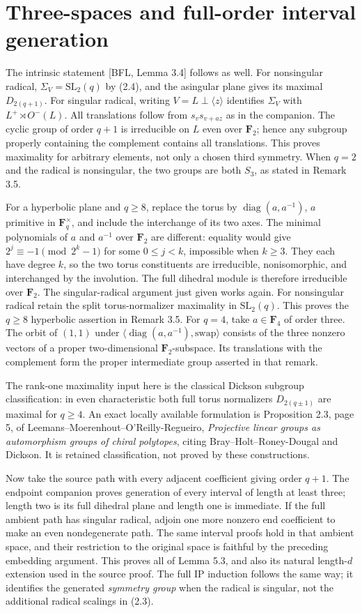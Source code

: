 \documentclass[11pt,a4paper]{article}
\newcommand{\gen}[1]{\langle#1\rangle}
\newcommand{\F}{\mathbf F}
\begin{document}
\section{Three-spaces and full-order interval generation}
The intrinsic statement [BFL, Lemma 3.4] follows as well.
For nonsingular radical, $\Sigma_V=\mathrm{SL}_2(q)$ by (2.4),
and the asingular plane gives its maximal $D_{2(q+1)}$.
For singular radical, writing $V=L\perp\gen z$ identifies
$\Sigma_V$ with $L^+\rtimes O^-(L)$. All translations follow
from $s_v s_{v+az}$ as in the companion. The cyclic group of
order $q+1$ is irreducible on $L$ even over $\F_2$; hence any
subgroup properly containing the complement contains all translations.
This proves maximality for arbitrary elements, not only a chosen
third symmetry. When $q=2$ and the radical is nonsingular, the
two groups are both $S_3$, as stated in Remark 3.5.

For a hyperbolic plane and $q\geq8$, replace the torus by
$\operatorname{diag}(a,a^{-1})$, $a$ primitive in $\F_q^\times$,
and include the interchange of its two axes. The minimal
polynomials of $a$ and $a^{-1}$ over $\F_2$ are different:
equality would give $2^j\equiv-1\pmod{2^k-1}$ for some
$0\leq j<k$, impossible when $k\geq3$. They each have degree
$k$, so the two torus constituents are irreducible, nonisomorphic,
and interchanged by the involution. The full dihedral module is
therefore irreducible over $\F_2$. The singular-radical argument
just given works again. For nonsingular radical retain the split
torus-normalizer maximality in $\mathrm{SL}_2(q)$.
This proves the $q\geq8$ hyperbolic assertion in Remark 3.5.
For $q=4$, take $a\in\F_4$ of order three. The orbit of $(1,1)$
under $\gen{\operatorname{diag}(a,a^{-1}),\text{swap}}$ consists
of the three nonzero vectors of a proper two-dimensional
$\F_2$-subspace. Its translations with the complement form the
proper intermediate group asserted in that remark.

The rank-one maximality input here is the classical Dickson
subgroup classification: in even characteristic both full torus
normalizers $D_{2(q\pm1)}$ are maximal for $q\geq4$.
An exact locally available formulation is Proposition 2.3, page 5,
of Leemans--Moerenhout--O'Reilly-Regueiro,
\emph{Projective linear groups as automorphism groups of chiral
polytopes}, citing Bray--Holt--Roney-Dougal and Dickson.
It is retained classification, not proved by these constructions.

Now take the source path with every adjacent coefficient giving
order $q+1$. The endpoint companion proves generation of every
interval of length at least three; length two is its full dihedral
plane and length one is immediate. If the full ambient path has
singular radical, adjoin one more nonzero end coefficient to make
an even nondegenerate path. The same interval proofs hold in that
ambient space, and their restriction to the original space is
faithful by the preceding embedding argument. This proves all of
Lemma 5.3, and also its natural length-$d$ extension used in the
source proof. The full IP induction follows the same way; it
identifies the generated \emph{symmetry group} when the radical
is singular, not the additional radical scalings in (2.3).
\end{document}
